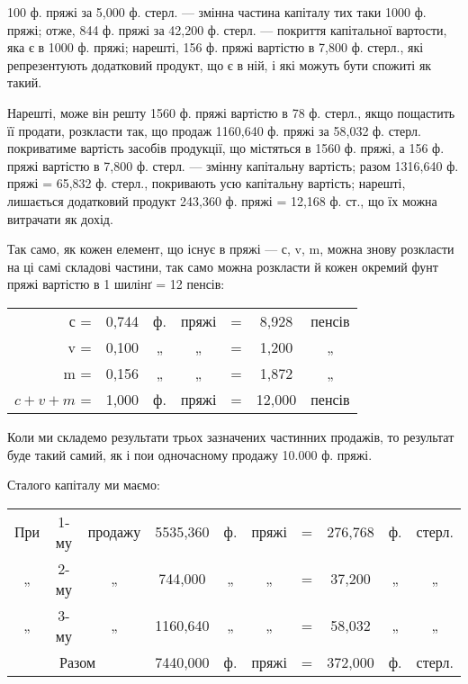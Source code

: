 \parcont{}  %
100 ф. пряжі за 5,000 ф. стерл. — змінна частина капіталу тих таки
1000 ф. пряжі; отже, 844 ф. пряжі за 42,200 ф. стерл. — покриття
капітальної вартости, яка є в 1000 ф. пряжі; нарешті, 156 ф. пряжі
вартістю в 7,800 ф. стерл., які репрезентують додатковий продукт, що
є в ній, і які можуть бути спожиті як такий.

Нарешті, може він решту 1560 ф. пряжі вартістю в 78 ф. стерл.,
якщо пощастить її продати, розкласти так, що продаж 1160,640 ф.
пряжі за 58,032 ф. стерл. покриватиме вартість засобів продукції, що
містяться в 1560 ф. пряжі, а 156 ф. пряжі вартістю в 7,800 ф. стерл. —
змінну капітальну вартість; разом 1316,640 ф. пряжі = 65,832 ф. стерл.,
покривають усю капітальну вартість; нарешті, лишається додатковий
продукт 243,360 ф. пряжі = 12,168 ф. ст., що їх можна витрачати як
дохід.

Так само, як кожен елемент, що існує в пряжі — с, v, m, можна
знову розкласти на ці самі складові частини, так само можна розкласти й
кожен окремий фунт пряжі вартістю в 1 шилінґ = 12 пенсів:
\begin{table}[h]
\centering
\setlength{\tabcolsep}{2pt}
\begin{tabularx}{\textwidth}{r c c c c c c}

с = & 0,744 & ф. & пряжі & = & 8,928 & пенсів \\
v = & 0,100 & „ & „ & = & 1,200 & „ \\
m = & 0,156 & „ & „ & = & 1,872 & „ \\
\cmidrule{1-7}
$c + v + m$  = & 1,000 & ф. & пряжі & = & 12,000 & пенсів \\
\end{tabularx}
\end{table}
Коли ми складемо результати трьох зазначених частинних продажів, то
результат буде такий самий, як і пои одночасному продажу 10.000 ф.
пряжі.

Сталого капіталу ми маємо:

\begin{table}[h]
  \setlength{\tabcolsep}{2pt}
  \begin{tabularx}{\textwidth}{c c c c c c c c c c}
    При & 1-му & продажу & 5535,360 & ф. & пряжі & = & 276,768 & ф. & стерл.\\
    „ & 2-му & „ & 744,000 & „ & „ & = & 37,200 & „ & „\\
    „ & 3-му & „ & 1160,640 & „ & „ & = & 58,032 & „ & „\\
    \cmidrule{1-10}
    \multicolumn{3}{c}{Разом} & 7440,000 & ф. & пряжі & = & 372,000 & ф. & стерл.\\
\end{tabularx}
\end{table}

